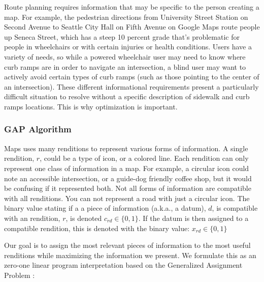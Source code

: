 Route planning requires information that may be specific to the person creating a map. For example, the pedestrian directions from University Street Station on Second Avenue to Seattle City Hall on Fifth Avenue on Google Maps route people up Seneca Street, which has a steep 10 percent grade that’s problematic for people in wheelchairs or with certain injuries or health conditions. %
Users have a variety of needs, so while a powered wheelchair user may need to know where curb ramps are in order to navigate an intersection, a blind user may want to actively avoid certain types of curb ramps (such as those pointing to the center of an intersection). These different informational requirements present a particularly difficult situation to resolve without a specific description of sidewalk and curb ramps locations. This is why optimization is important.

\subsubsection{GAP Algorithm}
Maps uses many renditions to represent various forms of information. A single rendition, $r$, could be a type of icon, or a colored line. Each rendition can only represent one class of information in a map. For example, a circular icon could note an accessible intersection, or a guide-dog friendly coffee shop, but it would be confusing if it represented both. Not all forms of information are compatible with all renditions. You can not represent a road with just a circular icon. The binary value stating if a a piece of information (a.k.a., a datum), $d$, is compatible with an rendition, $r$, is denoted $c_{rd} \in \{0,1\}$. If the datum is then assigned to a compatible rendition, this is denoted with the binary value: $x_{rd}\in \{0,1\}$

Our goal is to assign the most relevant pieces of information to the most useful renditions while maximizing the information we present. We  formulate this as an zero-one linear program interpretation based on the Generalized Assignment Problem
\cite{unknown_GAP}:


